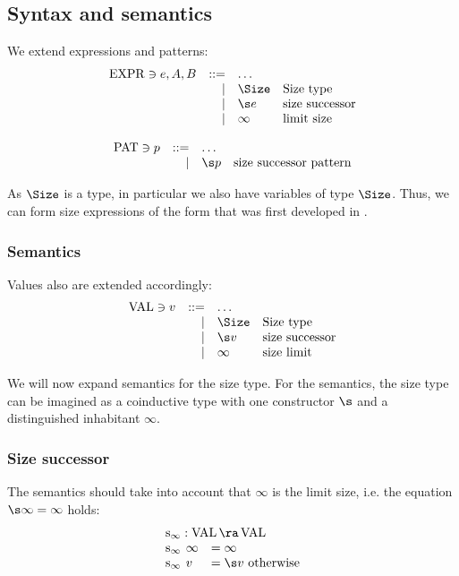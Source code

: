 \subsection{Syntax and semantics}

We extend expressions and patterns:
\[
\begin{array}{lrll}
\Expr \ni e,A,B & ::= & \ldots & \\
& \mid & \Size & \mbox{Size type} \\
& \mid & \s e  & \mbox{size successor}\\ 
& \mid & \infty & \mbox{limit size}\\
\end{array}
\]

\[
\begin{array}{lrll}
\Pat \ni p & ::= & \ldots & \\
& \mid & \s p & \mbox{size successor pattern}\\
\end{array}
\]

As $\Size$ is a type, in particular we also have variables of type $\Size$.
Thus, we can form size expressions of the form that was first developed in \cite{g+04:mscs}.


\subsubsection{Semantics}

Values also are extended accordingly:
\[
\begin{array}{lrll}
\Val \ni v & ::= & \ldots & \\
& \mid & \Size & \mbox{Size type}\\
& \mid & \s v & \mbox{size successor}\\
& \mid & \infty & \mbox{size limit}\\
\end{array}
\]

We will now expand semantics for the size type. For the semantics, the size type can be imagined as a coinductive type with one constructor $\s$ and a distinguished inhabitant $\infty$.

\subsubsection{Size successor}
The semantics should take into account that $\infty$ is the limit size, i.e. the equation $\s \infty = \infty$ holds:
\[
\begin{array}[t]{ll}
\multicolumn{2}{l}{\sinfty : \Val \ra \Val}\\ 
\sinfty \: \infty & = \infty\\
\sinfty \:  v & = \s v  \mbox{ otherwise}\\ 
\end{array}
\]

